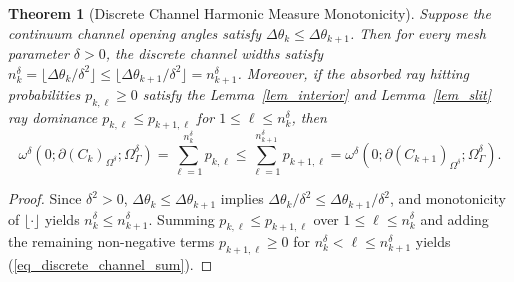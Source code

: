 \documentclass[11pt,reqno]{amsart}
\newtheorem{thm}{Theorem}[section]
\numberwithin{equation}{section}
\begin{document}
\begin{thm}[Discrete Channel Harmonic Measure Monotonicity] \label{thm_discrete_channel_mono}
Suppose the continuum channel opening angles satisfy $\Delta\theta_k \le \Delta\theta_{k+1}$. Then for every mesh parameter $\delta > 0$, the discrete channel widths satisfy $n_k^{\delta} = \lfloor \Delta\theta_k / \delta^2 \rfloor \le \lfloor \Delta\theta_{k+1} / \delta^2 \rfloor = n_{k+1}^{\delta}$. Moreover, if the absorbed ray hitting probabilities $p_{k,\ell} \ge 0$ satisfy the Lemma~\ref{lem_interior} and Lemma~\ref{lem_slit} ray dominance $p_{k,\ell} \le p_{k+1,\ell}$ for $1 \le \ell \le n_k^{\delta}$, then
\begin{equation} \label{eq_discrete_channel_sum}
  \omega^{\delta}(0 ; \partial (C_k)_{\Omega^{\delta}}; \varOmega^{\delta}_{\varGamma})
  = \sum_{\ell=1}^{n_k^{\delta}} p_{k,\ell}
  \le \sum_{\ell=1}^{n_{k+1}^{\delta}} p_{k+1,\ell}
  = \omega^{\delta}(0 ; \partial (C_{k+1})_{\Omega^{\delta}}; \varOmega^{\delta}_{\varGamma}).
\end{equation}
\end{thm}
\begin{proof}
Since $\delta^2 > 0$, $\Delta\theta_k \le \Delta\theta_{k+1}$ implies $\Delta\theta_k / \delta^2 \le \Delta\theta_{k+1} / \delta^2$, and monotonicity of $\lfloor \cdot \rfloor$ yields $n_k^{\delta} \le n_{k+1}^{\delta}$. Summing $p_{k,\ell} \le p_{k+1,\ell}$ over $1 \le \ell \le n_k^{\delta}$ and adding the remaining non-negative terms $p_{k+1,\ell} \ge 0$ for $n_k^{\delta} < \ell \le n_{k+1}^{\delta}$ yields (\ref{eq_discrete_channel_sum}).
\end{proof}
\end{document}
